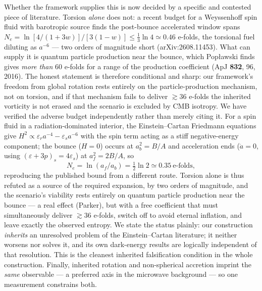 \documentclass[11pt]{article}
\begin{document}
Whether the framework supplies this is now decided by a specific and contested piece of literature.
Torsion \emph{alone} does not: a recent budget for a Weyssenhoff spin fluid with barotropic source
finds the post-bounce accelerated window spans $N_e = \ln[4/(1+3w)]/[3(1-w)] \le \tfrac{1}{3}\ln 4
\simeq 0.46$ e-folds, the torsional fuel diluting as $a^{-6}$ --- two orders of magnitude short
(arXiv:2608.11453). What can supply it is quantum particle production near the bounce, which
Popławski finds gives \emph{more than} 60 e-folds for a range of the production coefficient
(ApJ \textbf{832}, 96, 2016). The honest statement is therefore conditional and sharp: our
framework's freedom from global rotation rests entirely on the particle-production mechanism, not
on torsion, and if that mechanism fails to deliver $\gtrsim 36$ e-folds the inherited vorticity is
not erased and the scenario is excluded by CMB isotropy. We have verified the adverse budget
independently rather than merely citing it. For a spin fluid in a radiation-dominated interior,
the Einstein--Cartan Friedmann equations give $H^2 \propto \varepsilon_r a^{-4} - \varepsilon_s a^{-6}$
with the spin term acting as a stiff negative-energy component; the bounce ($H = 0$) occurs at
$a_b^2 = B/A$ and acceleration ends ($\ddot a = 0$, using $(\varepsilon+3p)_s = 4\varepsilon_s$)
at $a_f^2 = 2B/A$, so
\begin{equation}
N_e = \ln(a_f/a_b) = \tfrac{1}{2}\ln 2 \simeq 0.35\ \text{e-folds},
\end{equation}
reproducing the published bound from a different route. Torsion alone is thus refuted as a source
of the required expansion, by two orders of magnitude, and the scenario's viability rests entirely
on quantum particle production near the bounce --- a real effect (Parker), but with a free
coefficient that must simultaneously deliver $\gtrsim 36$ e-folds, switch off to avoid eternal
inflation, and leave exactly the observed entropy. We state the status plainly: our construction
\emph{inherits} an unresolved problem of the Einstein--Cartan literature; it neither worsens nor
solves it, and its own dark-energy results are logically independent of that resolution. This is
the cleanest inherited falsification condition in the whole construction. Finally, inherited rotation and non-spherical
accretion imprint the \emph{same} observable --- a preferred axis in the microwave background ---
so one measurement constrains both.
\end{document}
